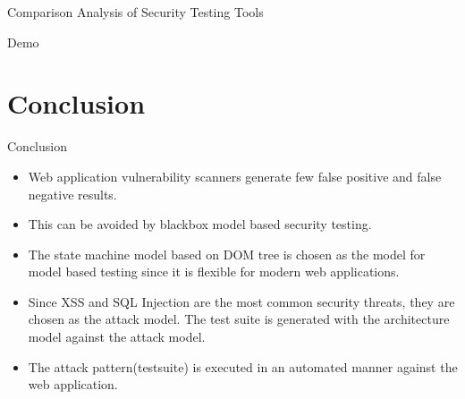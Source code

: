 \documentclass{beamer}
\begin{document}
\begin{frame}{Comparison Analysis of Security Testing Tools}
\begin{table}[!htb]
\caption{Comparison Analysis of Security Testing Tools}
\label{Comparitive Analysis of Security Testing Tools}
\end{table}
\end{frame}
\begin{frame}[plain,c]

\begin{center}
\Huge Demo
\end{center}

\end{frame}

\section{Conclusion}
\begin{frame}{Conclusion}
\begin{itemize}
    \item Web application vulnerability scanners generate few false positive and false negative results. 
    \item This can be avoided by blackbox model based security testing. 
    \item The state machine model based on DOM tree is chosen as the model for model based testing since it is flexible for modern web applications. 
    \item Since XSS and SQL Injection are the most common security threats, they are chosen as the attack model. The test suite is generated with the architecture model against the attack model. 
    \item The attack pattern(testsuite) is executed in an automated manner against the web application.

\end{itemize}


\end{frame}
\end{document}
